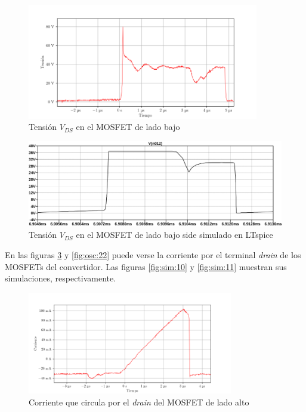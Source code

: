 \begin{figure}[H]
    \centering
    \includegraphics[width=0.9\textwidth]{images/capturas-osciloscopio/17-11-2022/36.png}
    \caption{Tensión $V_{DS}$ en el MOSFET de lado bajo}
    \label{fig:vds_low}
\end{figure}

\begin{figure}[H]
    \centering
    \includegraphics[width=\textwidth]{images/sim/18.pdf}
    \caption{Tensión $V_{DS}$ en el MOSFET de lado bajo side simulado en LTspice}
    \label{fig:vds_simulation_low}
\end{figure}


En las figuras \ref{fig:osc:20} y \ref{fig:osc:22} puede verse la corriente por el terminal \textit{drain} de los MOSFETs del convertidor. Las figuras \ref{fig:sim:10} y \ref{fig:sim:11} muestran sus simulaciones, respectivamente.

\begin{figure}[H]
    \centering
    \includegraphics[width=0.8\textwidth]{images/capturas-osciloscopio/17-11-2022/20.png}
    \caption{Corriente que circula por el \textit{drain} del MOSFET de lado alto}
    \label{fig:osc:20}
\end{figure}

